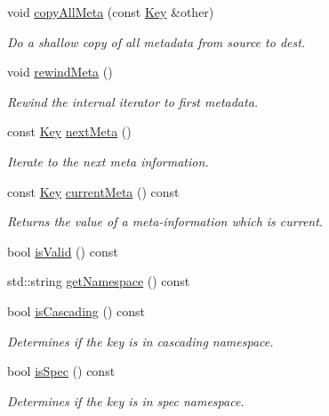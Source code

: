\begin{DoxyCompactItemize}
void \mbox{\hyperlink{classkdb_1_1Key_aec0910bf293db33deac6a3f81359cb48}{copy\+All\+Meta}} (const \mbox{\hyperlink{classkdb_1_1Key}{Key}} \&other)
\begin{DoxyCompactList}\small\item\em Do a shallow copy of all metadata from source to dest. \end{DoxyCompactList}\item 
void \mbox{\hyperlink{classkdb_1_1Key_a002af206119ceed17b106e2449cedc91}{rewind\+Meta}} ()
\begin{DoxyCompactList}\small\item\em Rewind the internal iterator to first metadata. \end{DoxyCompactList}\item 
const \mbox{\hyperlink{classkdb_1_1Key}{Key}} \mbox{\hyperlink{classkdb_1_1Key_a855f37fef58a4ea4006d9e281f66cfe1}{next\+Meta}} ()
\begin{DoxyCompactList}\small\item\em Iterate to the next meta information. \end{DoxyCompactList}\item 
const \mbox{\hyperlink{classkdb_1_1Key}{Key}} \mbox{\hyperlink{classkdb_1_1Key_a848292bf5591e5e845f74a487697cb19}{current\+Meta}} () const
\begin{DoxyCompactList}\small\item\em Returns the value of a meta-\/information which is current. \end{DoxyCompactList}\item 
bool \mbox{\hyperlink{classkdb_1_1Key_a69e621790e5717c56f7275e0b8d5e27c}{is\+Valid}} () const
\item 
std\+::string \mbox{\hyperlink{classkdb_1_1Key_a71b191c56eacb692c2f92ed440b32b46}{get\+Namespace}} () const
\item 
bool \mbox{\hyperlink{classkdb_1_1Key_a024ecb6d7c87244fb83c3fee58a0d696}{is\+Cascading}} () const
\begin{DoxyCompactList}\small\item\em Determines if the key is in cascading namespace. \end{DoxyCompactList}\item 
bool \mbox{\hyperlink{classkdb_1_1Key_acf01e9a60bbd0e2768be782d149ac700}{is\+Spec}} () const
\begin{DoxyCompactList}\small\item\em Determines if the key is in spec namespace. \end{DoxyCompactList}\item 

\end{DoxyCompactItemize}
